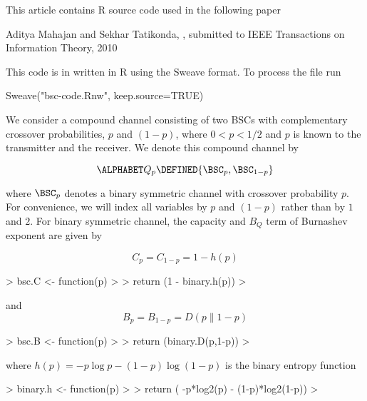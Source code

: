 
This article contains R source code used in the following paper

\startframedtext
  Aditya Mahajan and Sekhar Tatikonda, , 
  submitted to IEEE Transactions on Information Theory, 2010
\stopframedtext

This code is in written in R using the Sweave format. To process the file run

    Sweave("bsc-code.Rnw", keep.source=TRUE)



We consider a compound channel consisting of two BSCs with complementary
crossover probabilities, $p$ and $(1-p)$, where $0 < p < 1/2$ and $p$ is known
to the transmitter and the receiver. We denote this compound channel by

$$\ALPHABET Q_p \DEFINED \{\BSC_p, \BSC_{1-p}\} $$

where $\BSC_p$ denotes a binary symmetric channel with crossover probability
$p$. For convenience, we will index all variables by $p$ and $(1-p)$ rather than
by $1$ and $2$. For binary symmetric channel, the capacity and $B_Q$ term of
Burnashev exponent are given by

$$C_p = C_{1-p} = 1 - h(p)$$

\begin{Schunk}
\begin{Sinput}
> bsc.C <- function(p) 
> {
>   return (1 - binary.h(p)) 
> }
\end{Sinput}
\end{Schunk}

and
$$B_p = B_{1-p} = D(p \| 1-p) $$

\begin{Schunk}
\begin{Sinput}
> bsc.B <- function(p) 
> {
>   return (binary.D(p,1-p))
> }
\end{Sinput}
\end{Schunk}
  
where $h(p) = -p \log p - (1-p) \log (1-p)$ is the binary entropy function 

\begin{Schunk}
\begin{Sinput}
> binary.h <- function(p)
> {
>   return ( -p*log2(p) - (1-p)*log2(1-p))
> }
\end{Sinput}
\end{Schunk}

